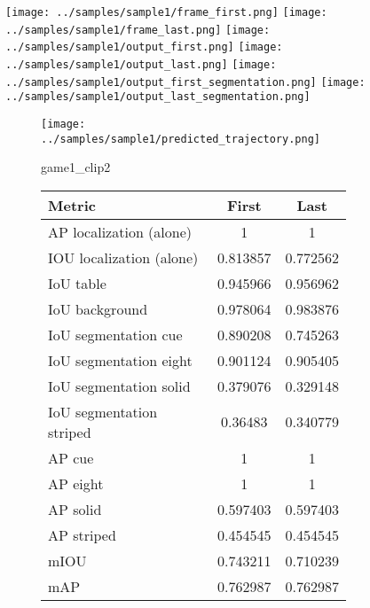 \begin{figure}
    \texttt{[image: ../samples/sample1/frame\_first.png]}
    \texttt{[image: ../samples/sample1/frame\_last.png]}
    \newline
    \texttt{[image: ../samples/sample1/output\_first.png]}
    \texttt{[image: ../samples/sample1/output\_last.png]}
    \newline
    \texttt{[image: ../samples/sample1/output\_first\_segmentation.png]}
    \texttt{[image: ../samples/sample1/output\_last\_segmentation.png]}
    \newline
    \begin{subfigure}[b]{0.49\textwidth}
        \vspace{20pt}
        \texttt{[image: ../samples/sample1/predicted\_trajectory.png]}
        \caption*{game1\_clip2}
    \end{subfigure}
\begin{subfigure}[b]{0.49\textwidth}
    \begin{tabular}{|l|c|c|}
        \hline
        \textbf{Metric} & \textbf{First} & \textbf{Last} \\
        \hline
        AP localization (alone) & 1 & 1 \\ 
        IOU localization (alone) & 0.813857 & 0.772562 \\ 
        \hline
        IoU table & 0.945966 & 0.956962 \\ 
        IoU background & 0.978064 & 0.983876 \\ 
        \hline
        IoU segmentation cue & 0.890208 & 0.745263 \\ 
        IoU segmentation eight & 0.901124 & 0.905405 \\ 
        IoU segmentation solid & 0.379076 & 0.329148 \\ 
        IoU segmentation striped & 0.36483 & 0.340779 \\ 
        \hline
        AP cue & 1 & 1 \\ 
        AP eight & 1 & 1 \\ 
        AP solid & 0.597403 & 0.597403 \\ 
        AP striped & 0.454545 & 0.454545 \\ 
        \hline
        mIOU & 0.743211 & 0.710239 \\ 
        mAP & 0.762987 & 0.762987 \\ 
        \hline
    \end{tabular}    
\end{subfigure}
\end{figure}

